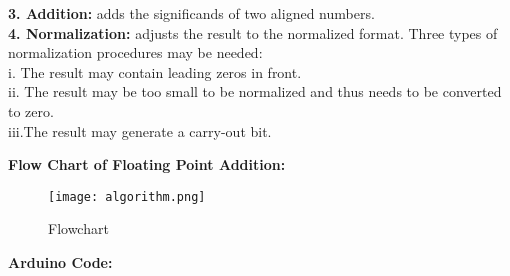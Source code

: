 \documentclass{article}
\begin{document}
\textbf{3. Addition:} adds  the significands of two aligned numbers. \\
 
\textbf{4. Normalization:} adjusts the result to the normalized format. Three types of normalization procedures may be needed:  \\
i.  The result may contain leading zeros in front. \\ 
ii. The result may be too small to be normalized and thus needs to be converted to zero.\\ 
iii.The result may generate a carry-out bit.\\
 \bigskip 
 \bigskip 
 
 
\textbf{Flow Chart of Floating Point Addition:}
\bigskip
\begin{figure}[htp]
\texttt{[image: algorithm.png]}
\caption{Flowchart}
\end{figure}

\bigskip 
\bigskip
\textbf{Arduino Code:}
\bigskip 
\end{document}
